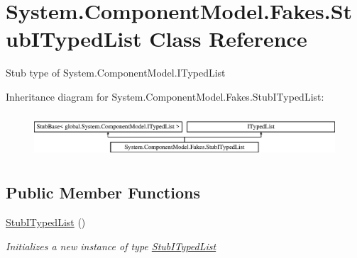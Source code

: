 \hypertarget{class_system_1_1_component_model_1_1_fakes_1_1_stub_i_typed_list}{\section{System.\-Component\-Model.\-Fakes.\-Stub\-I\-Typed\-List Class Reference}
\label{class_system_1_1_component_model_1_1_fakes_1_1_stub_i_typed_list}
}


Stub type of System.\-Component\-Model.\-I\-Typed\-List 


Inheritance diagram for System.\-Component\-Model.\-Fakes.\-Stub\-I\-Typed\-List\-:\begin{figure}[H]
\begin{center}
\leavevmode
\includegraphics[height=1.656805cm]{class_system_1_1_component_model_1_1_fakes_1_1_stub_i_typed_list}
\end{center}
\end{figure}
\subsection*{Public Member Functions}
\begin{DoxyCompactItemize}
\item 
\hyperlink{class_system_1_1_component_model_1_1_fakes_1_1_stub_i_typed_list_a2be89faff8b0e733dd1416c263776ee6}{Stub\-I\-Typed\-List} ()
\begin{DoxyCompactList}\small\item\em Initializes a new instance of type \hyperlink{class_system_1_1_component_model_1_1_fakes_1_1_stub_i_typed_list}{Stub\-I\-Typed\-List}\end{DoxyCompactList}\end{DoxyCompactItemize}
